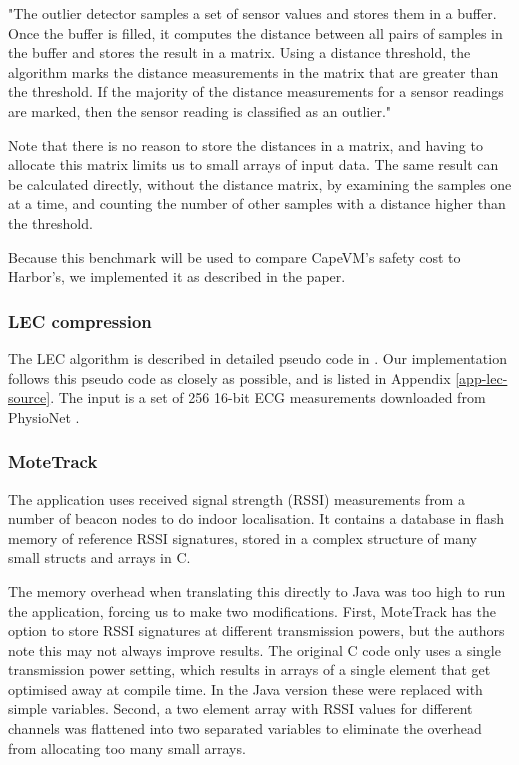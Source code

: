 \begin{displayquote}
"The outlier detector samples a set of sensor values and stores them in a buffer. Once the buffer is filled, it computes the distance between all pairs of samples in the buffer and stores the result in a matrix. Using a distance threshold, the algorithm marks the distance measurements in the matrix that are greater than the threshold. If the majority of the distance measurements for a sensor readings are marked, then the sensor reading is classified as an outlier."
\end{displayquote}

Note that there is no reason to store the distances in a matrix, and having to allocate this matrix limits us to small arrays of input data. The same result can be calculated directly, without the distance matrix, by examining the samples one at a time, and counting the number of other samples with a distance higher than the threshold.

Because this benchmark will be used to compare CapeVM's safety cost to Harbor's, we implemented it as described in the paper.

\subsubsection{LEC compression}
The LEC algorithm is described in detailed pseudo code in \cite{Marcelloni:2009ja}. Our implementation follows this pseudo code as closely as possible, and is listed in Appendix \ref{app-lec-source}. The input is a set of 256 16-bit ECG measurements downloaded from PhysioNet \cite{physionet-ecg-data}.

\subsubsection{MoteTrack}
\label{sec-evaluation-benchmark-implementation-motetrack}
The  application uses received signal strength (RSSI) measurements from a number of beacon nodes to do indoor localisation. It contains a database in flash memory of reference RSSI signatures, stored in a complex structure of many small structs and arrays in C.

The memory overhead when translating this directly to Java was too high to run the application, forcing us to make two modifications. First, MoteTrack has the option to store RSSI signatures at different transmission powers, but the authors note this may not always improve results. The original C code only uses a single transmission power setting, which results in arrays of a single element that get optimised away at compile time. In the Java version these were replaced with simple variables. Second, a two element array with RSSI values for different channels was flattened into two separated variables to eliminate the overhead from allocating too many small arrays.

